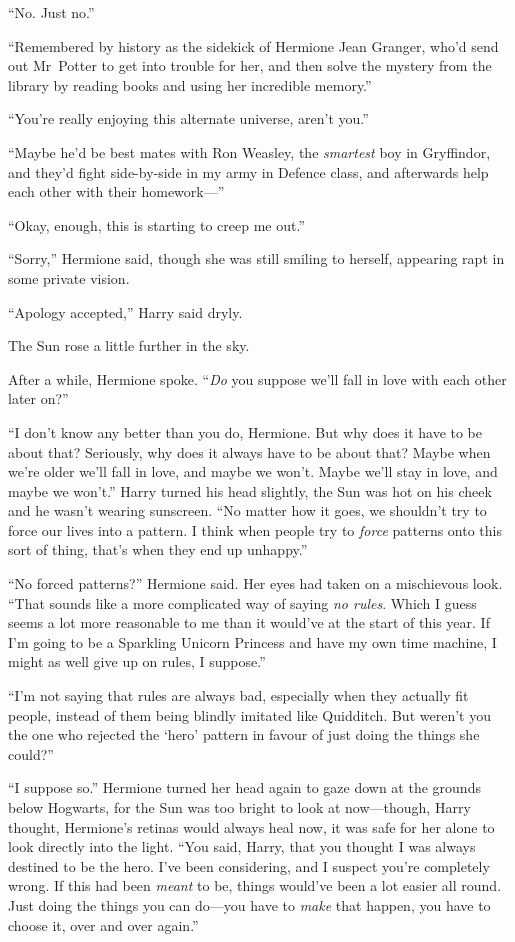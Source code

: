 “No. Just no.”

“Remembered by history as the sidekick of Hermione Jean Granger, who’d send out Mr~Potter to get into trouble for her, and then solve the mystery from the library by reading books and using her incredible memory.”

“You’re really enjoying this alternate universe, aren’t you.”

“Maybe he’d be best mates with Ron Weasley, the \emph{smartest} boy in Gryffindor, and they’d fight side-by-side in my army in Defence class, and afterwards help each other with their homework—”

“Okay, enough, this is starting to creep me out.”

“Sorry,” Hermione said, though she was still smiling to herself, appearing rapt in some private vision.

“Apology accepted,” Harry said dryly.

The Sun rose a little further in the sky.

After a while, Hermione spoke. “\emph{Do} you suppose we’ll fall in love with each other later on?”

“I don’t know any better than you do, Hermione. But why does it have to be about that? Seriously, why does it always have to be about that? Maybe when we’re older we’ll fall in love, and maybe we won’t. Maybe we’ll stay in love, and maybe we won’t.” Harry turned his head slightly, the Sun was hot on his cheek and he wasn’t wearing sunscreen. “No matter how it goes, we shouldn’t try to force our lives into a pattern. I think when people try to \emph{force} patterns onto this sort of thing, that’s when they end up unhappy.”

“No forced patterns?” Hermione said. Her eyes had taken on a mischievous look. “That sounds like a more complicated way of saying \emph{no rules}. Which I guess seems a lot more reasonable to me than it would’ve at the start of this year. If I’m going to be a Sparkling Unicorn Princess and have my own time machine, I might as well give up on rules, I suppose.”

“I’m not saying that rules are always bad, especially when they actually fit people, instead of them being blindly imitated like Quidditch. But weren’t you the one who rejected the ‘hero’ pattern in favour of just doing the things she could?”

“I suppose so.” Hermione turned her head again to gaze down at the grounds below Hogwarts, for the Sun was too bright to look at now—though, Harry thought, Hermione’s retinas would always heal now, it was safe for her alone to look directly into the light. “You said, Harry, that you thought I was always destined to be the hero. I’ve been considering, and I suspect you’re completely wrong. If this had been \emph{meant} to be, things would’ve been a lot easier all round. Just doing the things you can do—you have to \emph{make} that happen, you have to choose it, over and over again.”

